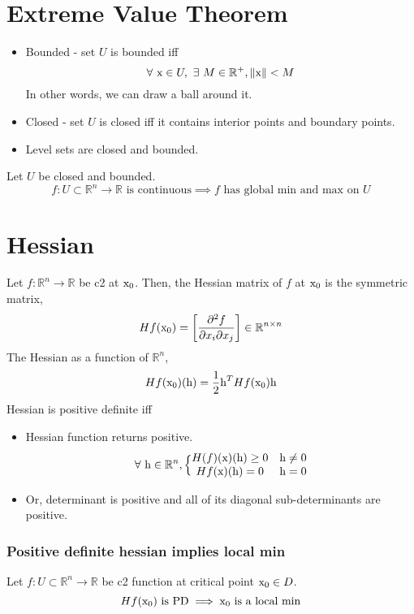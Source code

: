 \section*{Extreme Value Theorem}
\begin{itemize}
    \itemsep 0em
    \item Bounded - set $U$ is bounded iff $$\forall~\textrm{x}\in U,~ \exists~M\in \mathbb{R}^+, \left\lVert\textrm{x}\right\rVert<M$$
    In other words, we can draw a ball around it.
    \item Closed - set $U$ is closed iff it contains interior points and boundary points.
    \item Level sets are closed and bounded.
\end{itemize}
Let $U$ be closed and bounded.
$$f:U\subset \mathbb{R}^n \to\mathbb{R} \textrm{ is continuous} \implies f \textrm{ has global min and max on } U$$

\section*{Hessian}
Let $f:\mathbb{R}^n\to \mathbb{R}$ be c2 at $\textrm{x}_0$. Then, the Hessian matrix of $f$ at $\textrm{x}_0$ is the symmetric matrix,
$$Hf(\textrm{x}_0) = \left[ \frac{\partial^2f}{\partial x_i\partial x_j} \right] \in \mathbb{R}^{n\times n}$$
The Hessian as a function of $\mathbb{R}^n$,
$$Hf(\textrm{x}_0)(\textrm{h}) = \frac{1}{2}\textrm{h}^THf(\textrm{x}_0)\textrm{h}$$
Hessian is positive definite iff
\begin{itemize}
    \item Hessian function returns positive.
    $$\forall~\textrm{h} \in \mathbb{R}^n,
    \Big\{\begin{matrix}H(f)(\textrm{x})(\textrm{h}) \geq 0 & \textrm{h}\neq 0\\
    Hf(\textrm{x})(\textrm{h})=0 & \textrm{h}=0
    \end{matrix}$$
    \item Or, determinant is positive and all of its diagonal sub-determinants are positive.
\end{itemize}

\subsubsection*{Positive definite hessian implies local min}
Let  $f:U\subset \mathbb{R}^{n}\to \mathbb{R}$ be c2 function at critical point $\textrm{x}_0 \in D$. $$Hf(\textrm{x}_0) \textrm{ is PD}\implies \textrm{x}_0 \textrm{ is a local min}$$

